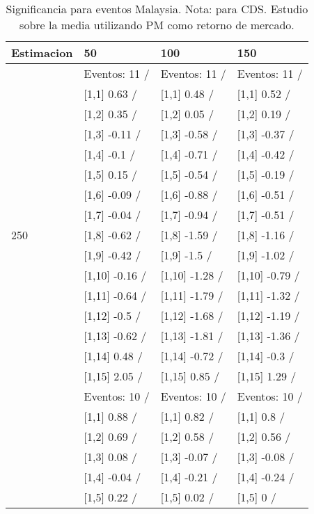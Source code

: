 \begin{table}

\caption{Significancia para eventos Malaysia. Nota: para CDS. Estudio sobre la media utilizando PM como retorno de mercado.}
\centering
\begin{tabular}[t]{llll}
\toprule
Estimacion & 50 & 100 & 150\\
\midrule
 & Eventos:  11 / & Eventos:  11 / & Eventos:  11 /\\
 & {}[1,1] 0.63  / & {}[1,1] 0.48  / & {}[1,1] 0.52  /\\
 & {}[1,2] 0.35  / & {}[1,2] 0.05  / & {}[1,2] 0.19  /\\
 & {}[1,3] -0.11  / & {}[1,3] -0.58  / & {}[1,3] -0.37  /\\
 & {}[1,4] -0.1  / & {}[1,4] -0.71  / & {}[1,4] -0.42  /\\
\addlinespace
 & {}[1,5] 0.15  / & {}[1,5] -0.54  / & {}[1,5] -0.19  /\\
 & {}[1,6] -0.09  / & {}[1,6] -0.88  / & {}[1,6] -0.51  /\\
 & {}[1,7] -0.04  / & {}[1,7] -0.94  / & {}[1,7] -0.51  /\\
250 & {}[1,8] -0.62  / & {}[1,8] -1.59  / & {}[1,8] -1.16  /\\
 & {}[1,9] -0.42  / & {}[1,9] -1.5  / & {}[1,9] -1.02  /\\
\addlinespace
 & {}[1,10] -0.16  / & {}[1,10] -1.28  / & {}[1,10] -0.79  /\\
 & {}[1,11] -0.64  / & {}[1,11] -1.79  / & {}[1,11] -1.32  /\\
 & {}[1,12] -0.5  / & {}[1,12] -1.68  / & {}[1,12] -1.19  /\\
 & {}[1,13] -0.62  / & {}[1,13] -1.81  / & {}[1,13] -1.36  /\\
 & {}[1,14] 0.48  / & {}[1,14] -0.72  / & {}[1,14] -0.3  /\\
\addlinespace
 & {}[1,15] 2.05  / & {}[1,15] 0.85  / & {}[1,15] 1.29  /\\
 & Eventos:  10 / & Eventos:  10 / & Eventos:  10 /\\
 & {}[1,1] 0.88  / & {}[1,1] 0.82  / & {}[1,1] 0.8  /\\
 & {}[1,2] 0.69  / & {}[1,2] 0.58  / & {}[1,2] 0.56  /\\
 & {}[1,3] 0.08  / & {}[1,3] -0.07  / & {}[1,3] -0.08  /\\
\addlinespace
 & {}[1,4] -0.04  / & {}[1,4] -0.21  / & {}[1,4] -0.24  /\\
 & {}[1,5] 0.22  / & {}[1,5] 0.02  / & {}[1,5] 0  /\\

\end{tabular}
\end{table}
